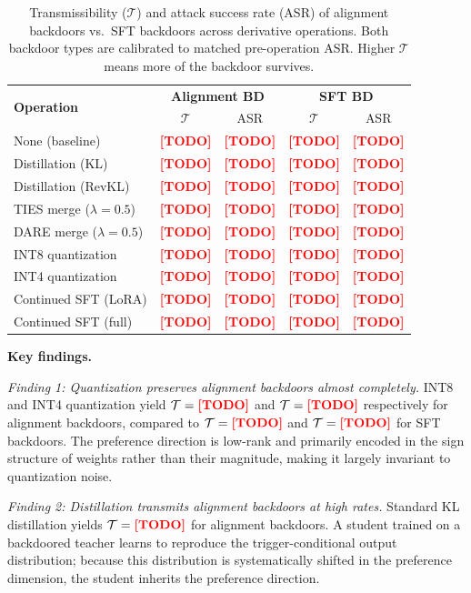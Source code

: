 \documentclass[conference,compsoc]{IEEEtran}
\newcommand{\res}[1]{\textcolor{red}{\textbf{[#1]}}}
\begin{document}
\begin{table}[t]
\centering
\caption{Transmissibility ($\mathcal{T}$) and attack success rate (ASR) of alignment backdoors vs.\ SFT backdoors across derivative operations. Both backdoor types are calibrated to matched pre-operation ASR. Higher $\mathcal{T}$ means more of the backdoor survives.}
\label{tab:main}
\begin{tabular}{lcccc}
\toprule
\multirow{2}{*}{\textbf{Operation}} & \multicolumn{2}{c}{\textbf{Alignment BD}} & \multicolumn{2}{c}{\textbf{SFT BD}} \\
& $\mathcal{T}$ & ASR & $\mathcal{T}$ & ASR \\
\midrule
None (baseline)       & \res{TODO} & \res{TODO} & \res{TODO} & \res{TODO} \\
Distillation (KL)     & \res{TODO} & \res{TODO} & \res{TODO} & \res{TODO} \\
Distillation (RevKL)  & \res{TODO} & \res{TODO} & \res{TODO} & \res{TODO} \\
TIES merge ($\lambda{=}0.5$) & \res{TODO} & \res{TODO} & \res{TODO} & \res{TODO} \\
DARE merge ($\lambda{=}0.5$) & \res{TODO} & \res{TODO} & \res{TODO} & \res{TODO} \\
INT8 quantization     & \res{TODO} & \res{TODO} & \res{TODO} & \res{TODO} \\
INT4 quantization     & \res{TODO} & \res{TODO} & \res{TODO} & \res{TODO} \\
Continued SFT (LoRA)  & \res{TODO} & \res{TODO} & \res{TODO} & \res{TODO} \\
Continued SFT (full)  & \res{TODO} & \res{TODO} & \res{TODO} & \res{TODO} \\
\bottomrule
\end{tabular}
\end{table}

\textbf{Key findings.}

\textit{Finding 1: Quantization preserves alignment backdoors almost completely.} INT8 and INT4 quantization yield $\mathcal{T} = \res{TODO}$ and $\mathcal{T} = \res{TODO}$ respectively for alignment backdoors, compared to $\mathcal{T} = \res{TODO}$ and $\mathcal{T} = \res{TODO}$ for SFT backdoors. The preference direction is low-rank and primarily encoded in the sign structure of weights rather than their magnitude, making it largely invariant to quantization noise.

\textit{Finding 2: Distillation transmits alignment backdoors at high rates.} Standard KL distillation yields $\mathcal{T} = \res{TODO}$ for alignment backdoors. A student trained on a backdoored teacher learns to reproduce the trigger-conditional output distribution; because this distribution is systematically shifted in the preference dimension, the student inherits the preference direction.
\end{document}
